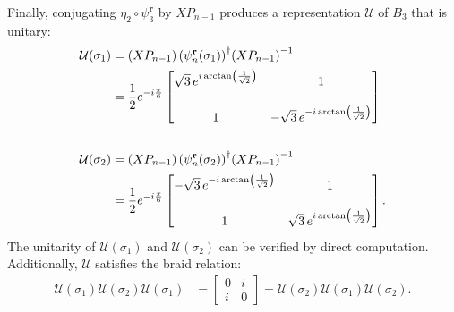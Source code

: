 \begin{example}
    Finally, conjugating $\eta_2\circ\psi_3^\textbf{r}$ by $XP_{n-1}$ produces a representation $\mathcal{U}$ of $B_3$ that is unitary:
    \begin{align*}
        \mathcal{U}(\sigma_1) &= \left( X P_{n-1} \right){\left( \psi_n^\mathbf{r} (\sigma_1)\right)}^\dagger{ \left( X P_{n-1} \right) }^{-1} \\
        &= \frac{1}{2}e^{-i\frac{\pi}{6}}\begin{bmatrix}
            \sqrt{3}\,e^{i\arctan\left( \frac{1}{\sqrt{2}} \right)} & 1 \\
            \\
            1 & -\sqrt{3}\,e^{-i\arctan\left( \frac{1}{\sqrt{2}} \right)}
        \end{bmatrix} \\ 
        \\
        \mathcal{U}(\sigma_2) &= \left( X P_{n-1} \right){\left( \psi_n^\mathbf{r} (\sigma_2)\right)}^\dagger{ \left( X P_{n-1} \right) }^{-1} \\
        &= \frac{1}{2}e^{-i\frac{\pi}{6}}\begin{bmatrix}
            -\sqrt{3}\,e^{-i\arctan\left( \frac{1}{\sqrt{2}} \right)} & 1 \\
            \\
            1 & \sqrt{3}\,e^{i\arctan\left( \frac{1}{\sqrt{2}} \right)}
        \end{bmatrix}.
    \end{align*}
    The unitarity of $\mathcal{U}(\sigma_1)$ and $\mathcal{U}(\sigma_2)$ can be verified by direct computation. Additionally, $\mathcal{U}$ satisfies the braid relation:
    \begin{align*}
        \mathcal{U}(\sigma_1)\mathcal{U}(\sigma_2)\mathcal{U}(\sigma_1) &= \begin{bmatrix}
            0 & i \\
            i & 0
        \end{bmatrix} = \mathcal{U}(\sigma_2)\mathcal{U}(\sigma_1)\mathcal{U}(\sigma_2).
    \end{align*}


\end{example}
